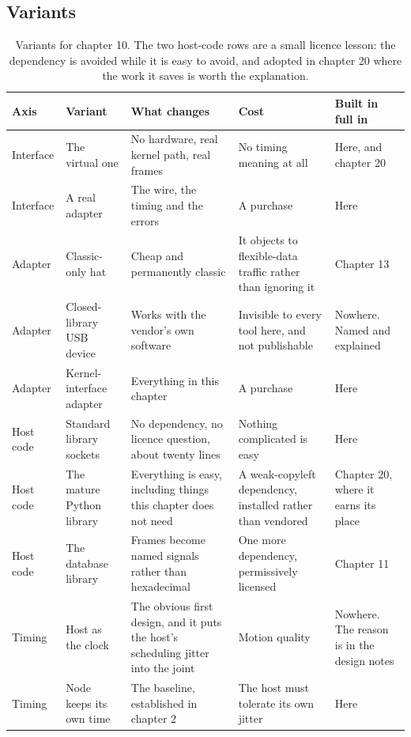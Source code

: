 \subsection*{Variants}

\begin{table}[H]\centering\small
\begin{tabular}{p{24mm}p{26mm}p{44mm}p{22mm}p{20mm}}
\toprule
Axis & Variant & What changes & Cost & Built in full in \\
\midrule
Interface & The virtual one & No hardware, real kernel path, real frames & No timing meaning at all & Here, and chapter 20 \\
Interface & A real adapter & The wire, the timing and the errors & A purchase & Here \\
Adapter & Classic-only hat & Cheap and permanently classic & It objects to flexible-data traffic rather than ignoring it & Chapter 13 \\
Adapter & Closed-library USB device & Works with the vendor's own software & Invisible to every tool here, and not publishable & Nowhere. Named and explained \\
Adapter & Kernel-interface adapter & Everything in this chapter & A purchase & Here \\
Host code & Standard library sockets & No dependency, no licence question, about twenty lines & Nothing complicated is easy & Here \\
Host code & The mature Python library & Everything is easy, including things this chapter does not need & A weak-copyleft dependency, installed rather than vendored & Chapter 20, where it earns its place \\
Host code & The database library & Frames become named signals rather than hexadecimal & One more dependency, permissively licensed & Chapter 11 \\
Timing & Host as the clock & The obvious first design, and it puts the host's scheduling jitter into the joint & Motion quality & Nowhere. The reason is in the design notes \\
Timing & Node keeps its own time & The baseline, established in chapter 2 & The host must tolerate its own jitter & Here \\
\bottomrule
\end{tabular}
\caption{Variants for chapter 10. The two host-code rows are a small licence lesson: the dependency is avoided while it is easy to avoid, and adopted in chapter 20 where the work it saves is worth the explanation.}
\end{table}

